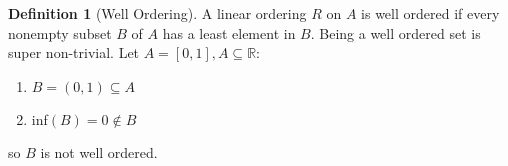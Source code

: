 \documentclass[10pt]{article}
\theoremstyle{definition}
\newtheorem{definition}[equation]{Definition}
\newcommand{\R}{\mathbb{R}}
\begin{document}
\begin{definition}[Well Ordering]
  A linear ordering $R$ on $A$ is well ordered if every nonempty subset $B$ of $A$ has a least element in $B$. Being a well ordered set is super non-trivial.
  Let $A=[0,1], A\subseteq\R$:
  \begin{enumerate}
    \item $B=(0,1)\subseteq A$
    \item inf$(B) = 0 \not\in B$
  \end{enumerate}
  so $B$ is not well ordered.
\end{definition}
\end{document}
